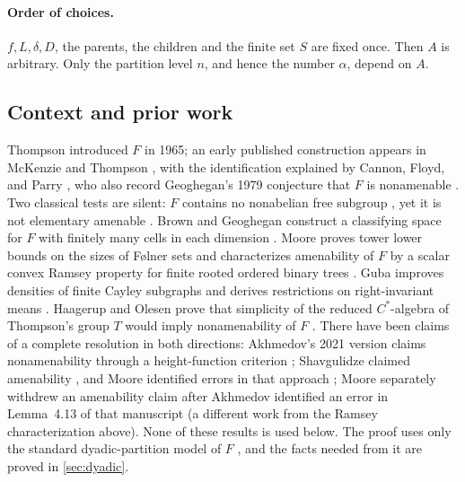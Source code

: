 \documentclass[11pt]{article}
\theoremstyle{definition}
\numberwithin{equation}{section}
\begin{document}
\paragraph{Order of choices.}
\(f,L,\delta,D\), the parents, the children and the finite set \(S\) are
fixed once. Then \(A\) is arbitrary. Only the partition level \(n\), and
hence the number \(\alpha\), depend on \(A\).

\subsection{Context and prior work}

Thompson introduced \(F\) in 1965; an early published construction appears
in McKenzie and Thompson \cite{McKenzieThompson1973}, with the identification
explained by Cannon, Floyd, and Parry
\cite[pp.~215--216]{CannonFloydParry1996}, who also record Geoghegan's 1979
conjecture that \(F\) is nonamenable \cite[p.~227]{CannonFloydParry1996}.
Two classical tests are silent: \(F\) contains no nonabelian free subgroup
\cite[Theorem~3.1]{BrinSquier1985}, yet it is not elementary amenable
\cite[Theorem~4.10]{CannonFloydParry1996}. Brown and Geoghegan construct a
classifying space for \(F\) with finitely many cells in each dimension
\cite{BrownGeoghegan1984}. Moore proves tower lower bounds on the sizes of
F\o lner sets \cite[Theorem~1.1]{MooreFolner2013} and characterizes
amenability of \(F\) by a scalar convex Ramsey property for finite rooted
ordered binary trees \cite[Theorem~3.1]{Moore2013}. Guba improves densities
of finite Cayley subgraphs \cite{Guba2025Density} and derives restrictions on
right-invariant means \cite{Guba2026}. Haagerup and Olesen prove that
simplicity of the reduced \(C^*\)-algebra of Thompson's group \(T\) would
imply nonamenability of \(F\) \cite[Theorem~5.5]{HaagerupOlesen2017}. There
have been claims of a complete resolution in both directions: Akhmedov's 2021
version claims nonamenability through a height-function criterion
\cite{Akhmedov2021}; Shavgulidze claimed amenability \cite{Shavgulidze2009},
and Moore identified errors in that approach \cite{Moore2011Critique}; Moore
separately withdrew an amenability claim after Akhmedov identified an error
in Lemma~4.13 of that manuscript \cite{Moore2012Withdrawn} (a different work
from the Ramsey characterization above). None of these results is used below.
The proof uses only the standard dyadic-partition model of \(F\)
\cite[Section~2, Lemma~2.2]{CannonFloydParry1996}, and the facts needed from
it are proved in \cref{sec:dyadic}.
\end{document}
